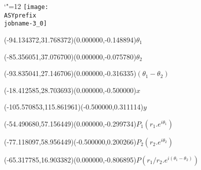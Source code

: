 \setlength{\unitlength}{1pt}%
\makeatletter%
\let\ASYencoding\f@encoding%
\let\ASYfamily\f@family%
\let\ASYseries\f@series%
\let\ASYshape\f@shape%
\makeatother%
{\catcode`"=12%
\texttt{[image: \\ASYprefix\\jobname-3\_0]}%
}%
%
\fontsize{6.000000}{7.200000}\selectfont%
\usefont{\ASYencoding}{\ASYfamily}{\ASYseries}{\ASYshape}%
\ASYalign(-94.134372,31.768372)(0.000000,-0.148894){$\theta_1$}%
%
\fontsize{6.000000}{7.200000}\selectfont%
\ASYalign(-85.356051,37.076700)(0.000000,-0.075780){$\theta_2$}%
%
\fontsize{6.000000}{7.200000}\selectfont%
\ASYalign(-93.835041,27.146706)(0.000000,-0.316335){$(\theta_1 - \theta_2)$}%
%
\fontsize{6.000000}{7.200000}\selectfont%
\ASYalign(-18.412585,28.703693)(0.000000,-0.500000){$x$}%
%
\fontsize{6.000000}{7.200000}\selectfont%
\ASYalign(-105.570853,115.861961)(-0.500000,0.311114){$y$}%
%
\fontsize{6.000000}{7.200000}\selectfont%
\ASYalign(-54.490680,57.156449)(0.000000,-0.299734){$P_1(r_1.e^{i\theta_1})$}%
%
\fontsize{6.000000}{7.200000}\selectfont%
\ASYalign(-77.118097,58.956449)(-0.500000,0.200266){$P_2(r_2.e^{i\theta_2})$}%
%
\fontsize{6.000000}{7.200000}\selectfont%
\ASYalign(-65.317785,16.903382)(0.000000,-0.806895){$P(r_1/r_2.e^{i(\theta_1 - \theta_2)})$}%
